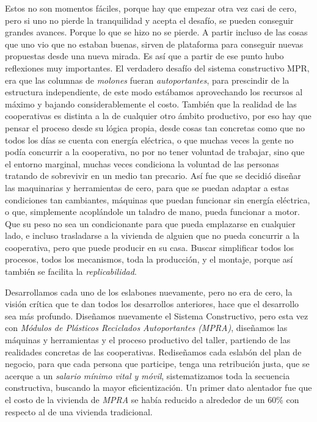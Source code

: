\documentclass[
]{article}
\begin{document}
Estos no son momentos fáciles, porque hay que empezar otra vez casi de
cero, pero si uno no pierde la tranquilidad y acepta el desafío, se
pueden conseguir grandes avances. Porque lo que se hizo no se pierde. A
partir incluso de las cosas que uno vio que no estaban buenas, sirven de
plataforma para conseguir nuevas propuestas desde una nueva mirada. Es
así que a partir de ese punto hubo reflexiones muy importantes. El
verdadero desafío del sistema constructivo MPR, era que las columnas de
\emph{molones} fueran \emph{autoportantes}, para prescindir de la
estructura independiente, de este modo estábamos aprovechando los
recursos al máximo y bajando considerablemente el costo. También que la
realidad de las cooperativas es distinta a la de cualquier otro ámbito
productivo, por eso hay que pensar el proceso desde su lógica propia,
desde cosas tan concretas como que no todos los días se cuenta con
energía eléctrica, o que muchas veces la gente no podía concurrir a la
cooperativa, no por no tener voluntad de trabajar, sino que el entorno
marginal, muchas veces condiciona la voluntad de las personas tratando
de sobrevivir en un medio tan precario. Así fue que se decidió diseñar
las maquinarias y herramientas de cero, para que se puedan adaptar a
estas condiciones tan cambiantes, máquinas que puedan funcionar sin
energía eléctrica, o que, simplemente acoplándole un taladro de mano,
pueda funcionar a motor. Que su peso no sea un condicionante para que
pueda emplazarse en cualquier lado, e incluso trasladarse a la vivienda
de alguien que no pueda concurrir a la cooperativa, pero que puede
producir en su casa. Buscar simplificar todos los procesos, todos los
mecanismos, toda la producción, y el montaje, porque así también se
facilita la \emph{replicabilidad}.

Desarrollamos cada uno de los eslabones nuevamente, pero no era de cero,
la visión crítica que te dan todos los desarrollos anteriores, hace que
el desarrollo sea más profundo. Diseñamos nuevamente el Sistema
Constructivo, pero esta vez con \emph{Módulos de Plásticos Reciclados
Autoportantes (MPRA)}, diseñamos las máquinas y herramientas y el
proceso productivo del taller, partiendo de las realidades concretas de
las cooperativas. Rediseñamos cada eslabón del plan de negocio, para que
cada persona que participe, tenga una retribución justa, que se acerque
a un \emph{salario mínimo vital y móvil}, sistematizamos toda la
secuencia constructiva, buscando la mayor eficientización. Un primer
dato alentador fue que el costo de la vivienda de \emph{MPRA} se había
reducido a alrededor de un 60\% con respecto al de una vivienda
tradicional.
\end{document}
